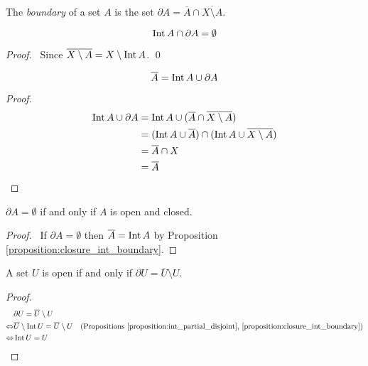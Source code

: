 \begin{definition}[Boundary]
    The \emph{boundary} of a set $A$ is the set $\partial A = \overline{A} \cap \overline{X \setminus A}$.
\end{definition}

\begin{proposition}
    \label{proposition:int_partial_disjoint}
    \[ \operatorname{Int} A \cap \partial A = \emptyset \]
\end{proposition}

\begin{proof}
    \pf\ Since $\overline{X \setminus A} = X \setminus \operatorname{Int} A$. \qed
\end{proof}

\begin{proposition}
    \label{proposition:closure_int_boundary}
    \[ \overline{A} = \operatorname{Int} A \cup \partial A \]
\end{proposition}

\begin{proof}
    \pf
    \begin{align*}
        \operatorname{Int} A \cup \partial A & = \operatorname{Int} A \cup (\overline{A} \cap \overline{X \setminus A}) \\
        & = (\operatorname{Int} A \cup \overline{A}) \cap (\operatorname{Int} A \cup \overline{X \setminus A}) \\
        & = \overline{A} \cap X \\
        & = \overline{A}
    \end{align*}
\end{proof}

\begin{proposition}
    $\partial A = \emptyset$ if and only if $A$ is open and closed.
\end{proposition}

\begin{proof}
    \pf\ If $\partial A = \emptyset$ then $\overline{A} = \operatorname{Int} A$ by Proposition \ref{proposition:closure_int_boundary}.
\end{proof}

\begin{proposition}
    A set $U$ is open if and only if $\partial U = \overline{U} \setminus U$.
\end{proposition}

\begin{proof}
    \pf
    \begin{align*}
        & \partial U = \overline{U} \setminus U \\
        \Leftrightarrow & \overline{U} \setminus \operatorname{Int} U = \overline{U} \setminus U & (\text{Propositions \ref{proposition:int_partial_disjoint}, \ref{proposition:closure_int_boundary}})\\
        \Leftrightarrow & \operatorname{Int} U = U & \relax
    \end{align*}
\end{proof}

